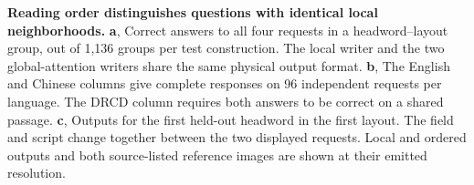 \textbf{Reading order distinguishes questions with identical local neighborhoods.}
\textbf{a}, Correct answers to all four requests in a headword--layout group, out of 1,136 groups per test construction. The local writer and the two global-attention writers share the same physical output format. \textbf{b}, The English and Chinese columns give complete responses on 96 independent requests per language. The DRCD column requires both answers to be correct on a shared passage. \textbf{c}, Outputs for the first held-out headword in the first layout. The field and script change together between the two displayed requests. Local and ordered outputs and both source-listed reference images are shown at their emitted resolution.
